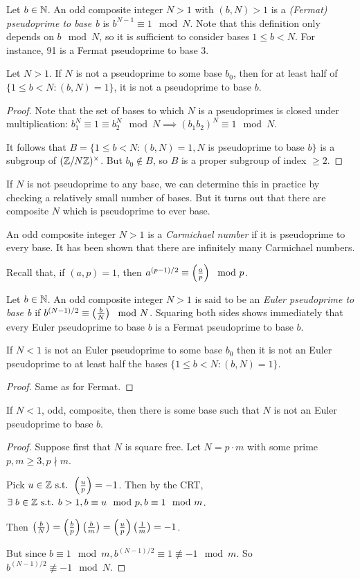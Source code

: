 \documentclass[10pt,a4paper]{article}
\begin{document}
Let $b \in \mathbb{N}$. An odd composite integer $N >1$ with $(b,N) > 1$ is a \emph{(Fermat) pseudoprime to base b} is $b^{N-1} \equiv 1 \mod N$. Note that this definition only depends on $b \mod N$, so it is sufficient to consider bases $1 \leq b < N$. For instance, 91 is a Fermat pseudoprime to base $3$.

\begin{proposition}
Let $N > 1$. If $N$ is not a pseudoprime to some base $b_0$, then for at least half of $\{1 \leq b < N : (b,N) = 1\}$, it is not a pseudoprime to base $b$.
\end{proposition}
\begin{proof}
Note that the set of bases to which $N$ is a pseudoprimes is closed under multiplication: $b_1^N \equiv 1 \equiv b_2^N \mod N \implies (b_1b_2)^N \equiv 1 \mod N$.

It follows that $B = \{1 \leq b < N: (b,N) = 1, N$ is pseudoprime to base $b\}$ is a subgroup of $(\mathbb{Z}/N\mathbb{Z})^{\times}$. But $b_0 \notin B$, so $B$ is a proper subgroup of index $\geq 2$.
\end{proof}

If $N$ is not pseudoprime to any base, we can determine this in practice by checking a relatively small number of bases. But it turns out that there are composite $N$ which is pseudoprime to ever base.

An odd composite integer $N > 1$ is a \emph{Carmichael number} if it is pseudoprime to every base. It has been shown that there are infinitely many Carmichael numbers.

Recall that, if $(a,p)=1$, then $a^{(p-1)/2} \equiv \left(\frac{a}{p}\right) \mod p$.

Let $b \in \mathbb{N}$. An odd composite integer $N >1$ is said to be an \emph{Euler pseudoprime to base b} if $b^{(N-1)/2} \equiv \left(\frac{b}{N}\right) \mod N$. Squaring both sides shows immediately that every Euler pseudoprime to base $b$ is a Fermat pseudoprime to base $b$.

\begin{proposition}
If $N<1$ is not an Euler pseudoprime to some base $b_0$ then it is not an Euler pseudoprime to at least half the bases $\{1\leq b<N : (b,N) = 1\}$.
\end{proposition}
\begin{proof}
Same as for Fermat.
\end{proof}
\begin{theorem}
If $N<1$, odd, composite, then there is some base such that $N$ is not an Euler pseudoprime to base $b$.
\end{theorem}
\begin{proof}
Suppose first that $N$ is square free. Let $N = p\cdot m$ with some prime $p, m \geq 3, p\nmid m$.

Pick $u \in \mathbb{Z} \text{ s.t. } \left(\frac{u}{p}\right)=-1$. Then by the CRT, $\exists b \in \Z \st b >1, b \equiv u \mod p, b \equiv 1 \mod m$.

Then $\left(\frac{b}{N}\right) = \left(\frac{b}{p}\right)\left(\frac{b}{m}\right) = \left(\frac{u}{p}\right)\left(\frac{1}{m}\right) = -1$.

But since $ b \equiv 1 \mod m, b^{(N-1)/2} \equiv 1 \nequiv -1 \mod m$. So $b^{(N-1)/2} \nequiv -1 \mod N$.
\end{proof}
\end{document}
